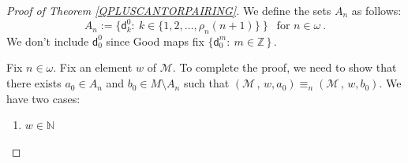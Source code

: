 \documentclass[10pt,a4paper, openany,  oldfontcommands]{memoir}
\newtheorem{open problem} [theorem] {Open Problem}
\newtheorem{open question} [theorem] {Open Question}
\begin{document}
\begin{proof}[Proof of  Theorem  \ref{QPLUSCANTORPAIRING}]




We define the sets  $  A_n  $  as follows: 
\[
A_n  :=   \big\{   \mathsf{d}^0_{ k }  :   \   k \in  \lbrace 1, 2,  \ldots ,  \rho_n  \left( n  +1 \right)    \rbrace   \   \big\} 
\    \    \mbox{  for   }    n  \in  \omega 
\         . 
\]
We don't include   $  \mathsf{d}^0_0 $   since  \textsf{Good} maps fix  
$  \big\{   \mathsf{d}^m_{ 0 }  :    \    m  \in  \mathbb{Z}   \,   \big\}    \,   $. 









Fix $ n  \in  \omega  $.   
Fix  an element $ w  $  of   $  \mathcal{M} $. 
To complete the proof,  we need to show that there exists  $  a_0   \in  A_n  $  and  $  b_0  \in M \setminus A_n $  such that 
$  \left( \mathcal{M}   \, , \, w,     a_0    \right)  \equiv_n    \left( \mathcal{M}   \, , \,  w   ,   b_0    \right)    $.  
We have two  cases: 
 \begin{enumerate}
\item     $  w     \in  \mathbb{N}  $





\end{enumerate}
\end{proof}
\end{document}
